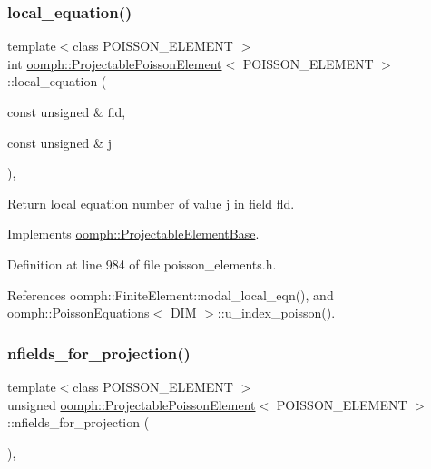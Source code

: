 \subsubsection{\texorpdfstring{local\+\_\+equation()}{local\_equation()}}
{\footnotesize\ttfamily template$<$class P\+O\+I\+S\+S\+O\+N\+\_\+\+E\+L\+E\+M\+E\+NT $>$ \\
int \hyperlink{classoomph_1_1ProjectablePoissonElement}{oomph\+::\+Projectable\+Poisson\+Element}$<$ P\+O\+I\+S\+S\+O\+N\+\_\+\+E\+L\+E\+M\+E\+NT $>$\+::local\+\_\+equation (\begin{DoxyParamCaption}\item[{const unsigned \&}]{fld,  }\item[{const unsigned \&}]{j }\end{DoxyParamCaption})\hspace{0.3cm}{\ttfamily [inline]}, {\ttfamily [virtual]}}



Return local equation number of value j in field fld. 



Implements \hyperlink{classoomph_1_1ProjectableElementBase_ac5c27ae929ff636dc7747fe23fd4f738}{oomph\+::\+Projectable\+Element\+Base}.



Definition at line 984 of file poisson\+\_\+elements.\+h.



References oomph\+::\+Finite\+Element\+::nodal\+\_\+local\+\_\+eqn(), and oomph\+::\+Poisson\+Equations$<$ D\+I\+M $>$\+::u\+\_\+index\+\_\+poisson().

\mbox{\label{classoomph_1_1ProjectablePoissonElement_a0b8e911e3eca8dbfecd30a5e8dc2ff33}} 
\subsubsection{\texorpdfstring{nfields\+\_\+for\+\_\+projection()}{nfields\_for\_projection()}}
{\footnotesize\ttfamily template$<$class P\+O\+I\+S\+S\+O\+N\+\_\+\+E\+L\+E\+M\+E\+NT $>$ \\
unsigned \hyperlink{classoomph_1_1ProjectablePoissonElement}{oomph\+::\+Projectable\+Poisson\+Element}$<$ P\+O\+I\+S\+S\+O\+N\+\_\+\+E\+L\+E\+M\+E\+NT $>$\+::nfields\+\_\+for\+\_\+projection (\begin{DoxyParamCaption}{ }\end{DoxyParamCaption})\hspace{0.3cm}{\ttfamily [inline]}, {\ttfamily [virtual]}}



